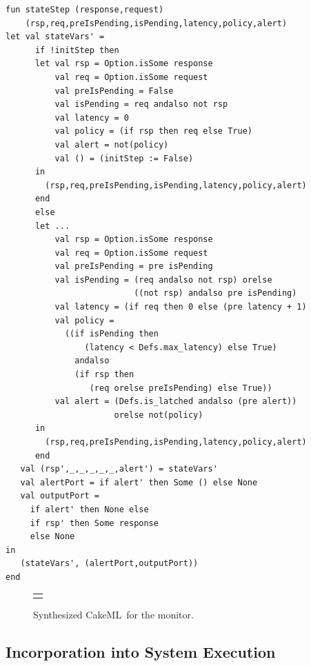 \documentclass[global,twocolumn]{svjour}
\newcommand{\ckml}{CakeML}
\begin{document}
\newsavebox{\monFn}
\begin{lrbox}{\monFn}
\begin{lstlisting}[style=myML]
fun stateStep (response,request)
    (rsp,req,preIsPending,isPending,latency,policy,alert)
let val stateVars' =
      if !initStep then
      let val rsp = Option.isSome response
          val req = Option.isSome request
          val preIsPending = False
          val isPending = req andalso not rsp
          val latency = 0
          val policy = (if rsp then req else True)
          val alert = not(policy)
          val () = (initStep := False)
      in
        (rsp,req,preIsPending,isPending,latency,policy,alert)
      end
      else
      let ...
          val rsp = Option.isSome response
          val req = Option.isSome request
          val preIsPending = pre isPending
          val isPending = (req andalso not rsp) orelse
                          ((not rsp) andalso pre isPending)
          val latency = (if req then 0 else (pre latency + 1)
          val policy =
            ((if isPending then
                (latency < Defs.max_latency) else True)
              andalso
              (if rsp then
                 (req orelse preIsPending) else True))
          val alert = (Defs.is_latched andalso (pre alert))
                      orelse not(policy)
      in
        (rsp,req,preIsPending,isPending,latency,policy,alert)
      end
   val (rsp',_,_,_,_,_,alert') = stateVars'
   val alertPort = if alert' then Some () else None
   val outputPort =
     if alert' then None else
     if rsp' then Some response
     else None
in
   (stateVars', (alertPort,outputPort))
end
\end{lstlisting}
\end{lrbox}

\begin{figure}
  \begin{center}
    \begin{tabular}{c}
      \resizebox{\columnwidth}{!}{\usebox{\monFn}}
    \end{tabular}
  \end{center}
  \caption{Synthesized \ckml\ for the monitor.}
  \label{fig:monitor-cakeml}
\end{figure}

\subsection{Incorporation into System Execution}
\end{document}
